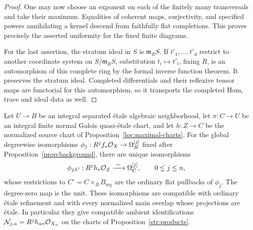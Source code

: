 \begin{proof}
One may now choose an exponent on each of the finitely many
transversals and take their maximum.  Equalities of coherent maps,
surjectivity, and specified powers annihilating a kernel descend from
faithfully flat completions.  This proves precisely the asserted
uniformity for the fixed finite diagrams.

For the last assertion, the stratum ideal in $S$ is
$\mathfrak m_RS$.  If $t'_1,\ldots,t'_d$ restrict to another coordinate
system on $S/\mathfrak m_RS$, substitution $t_i\mapsto t'_i$, fixing
$R$, is an automorphism of this complete ring by the formal inverse
function theorem.  It preserves the stratum ideal.  Completed
differentials and their reflexive tensor maps are functorial for this
automorphism, so it transports the completed Hom, trace and ideal
data as well.
\end{proof}

\begin{proposition}
\label{str:direct-images}
Let $U\to B$ be an integral separated \'etale algebraic neighborhood,
let $\pi:C\to U$ be an integral finite normal Galois quasi-\'etale
chart, and let $h:Z\to C$ be the normalized source chart of
Proposition~\ref{loc:maximal-charts}.  For the global degreewise
isomorphisms $\phi_j:R^jf_*\mathcal O_X\to\Omega_B^{[j]}$ fixed after
Proposition~\ref{prop:background}, there are unique isomorphisms
\[
 \phi_{j,C}:R^jh_*\cO_Z\xrightarrow{\ \sim\ }\Omega_C^{[j]},
 \qquad 0\leq j\leq n,
\]
whose restrictions to $C^\circ=C\times_BB_{\mathrm{reg}}$ are the
ordinary flat pullbacks of $\phi_j$.  The degree-zero map is the
unit.  These isomorphisms are compatible with ordinary \'etale
refinement and with every normalized main overlap whose projections
are \'etale.  In particular they give compatible ambient
identifications $\mathcal N_{j,\alpha}=R^jh_{\alpha*}\mathcal O_{X_\alpha}$
on the charts of Proposition~\ref{str:products}.
\end{proposition}

